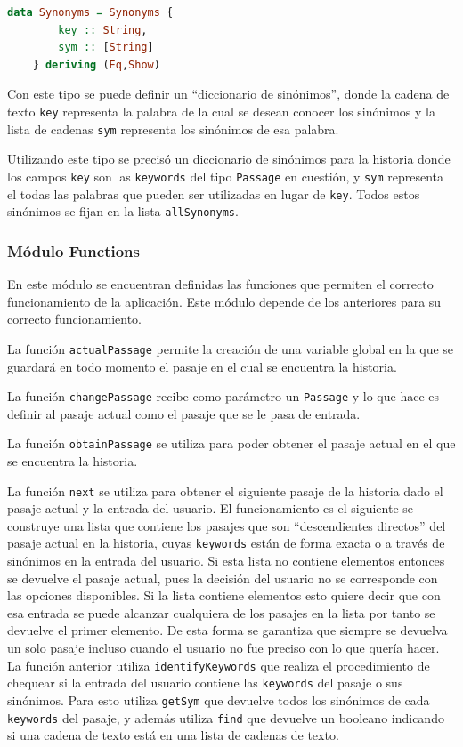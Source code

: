 \documentclass[12pt]{article}
\begin{document}
\begin{lstlisting}[language=Haskell, morekeywords={fix}]
data Synonyms = Synonyms { 
        key :: String, 
        sym :: [String]
    } deriving (Eq,Show)
\end{lstlisting}

Con este tipo se puede definir un ``diccionario de sinónimos'', donde la cadena de texto \verb|key| representa la palabra de la cual se desean conocer los sinónimos y la lista de cadenas \verb|sym| representa los sinónimos de esa palabra.

Utilizando este tipo se precisó un diccionario de sinónimos para la historia donde los campos \verb|key| son las \verb|keywords| del tipo \verb|Passage| en cuestión, y \verb|sym| representa el todas las palabras que pueden ser utilizadas en lugar de \verb|key|. Todos estos sinónimos se fijan en la lista \verb|allSynonyms|. 

\subsubsection{Módulo Functions}

En este módulo se encuentran definidas las funciones que permiten el correcto funcionamiento de la aplicación. Este módulo depende de los anteriores para su correcto funcionamiento.

La función \verb|actualPassage| permite la creación de una variable global en la que se guardará en todo momento el pasaje en el cual se encuentra la historia. 

La función \verb|changePassage| recibe como parámetro un \verb|Passage| y lo que hace es definir al pasaje actual como el pasaje que se le pasa de entrada.

La función \verb|obtainPassage| se utiliza para poder obtener el pasaje actual en el que se encuentra la historia.

La función \verb|next| se utiliza para obtener el siguiente pasaje de la historia dado el pasaje actual y la entrada del usuario. El funcionamiento es el siguiente se construye una lista que contiene los pasajes que son ``descendientes directos'' del pasaje actual en la historia, cuyas \verb|keywords| están de forma exacta o a través de sinónimos en la entrada del usuario. Si esta lista no contiene elementos entonces se devuelve el pasaje actual, pues la decisión del usuario no se corresponde con las opciones disponibles. Si la lista contiene elementos esto quiere decir que con esa entrada se puede alcanzar cualquiera de los pasajes en la lista por tanto se devuelve el primer elemento. De esta forma se garantiza que siempre se devuelva un solo pasaje incluso cuando el usuario no fue preciso con lo que quer\'ia hacer. La función anterior utiliza  \verb|identifyKeywords| que realiza el procedimiento de chequear si la entrada del usuario contiene las \verb|keywords| del pasaje o sus sinónimos. Para esto utiliza \verb|getSym| que devuelve todos los sinónimos de cada \verb|keywords| del pasaje, y además utiliza \verb|find| que devuelve un booleano indicando si una cadena de texto está en una lista de cadenas de texto.
\end{document}
